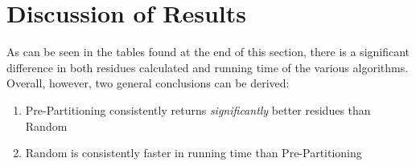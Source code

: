 \documentclass[12pt]{article}
\begin{document}
\section{Discussion of Results}
As can be seen in the tables found at the end of this section, there is a significant difference in both residues calculated and running time of the various algorithms. Overall, however, two general conclusions can be derived:
\begin{enumerate}
\item Pre-Partitioning consistently returns \textit{significantly} better residues than Random
\item Random is consistently faster in running time than Pre-Partitioning
\end{enumerate}



\break
\end{document}
